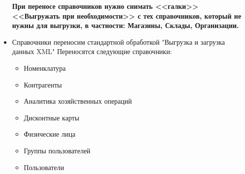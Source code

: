 \begin{itemize}
	\begin{warning}
    \textbf{При переносе справочников нужно снимать <<галки>> <<Выгружать при необходимости>>
        с тех справочников, который не нужны для выгрузки, в частности: Магазины, Склады, Организации.}
\end{warning}
\item Справочники переносим стандартной обработкой "Выгрузка и загрузка данных XML"
Переносятся следующие справочники:
\begin{itemize}
    \item Номенклатура
    \item Контрагенты
    \item Аналитика хозяйственных операций
    \item Дисконтные карты
    \item Физические лица
    \item Группы пользователей
    \item Пользователи
\end{itemize}

\end{itemize}
